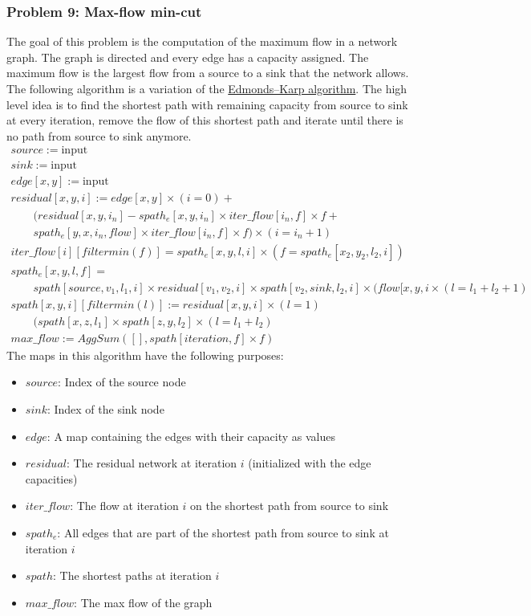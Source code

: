 \documentclass[11pt]{article}
\begin{document}
\subsubsection*{Problem 9: Max-flow min-cut}
The goal of this problem is the computation of the maximum flow in a network graph.
The graph is directed and every edge has a capacity assigned.
The maximum flow is the largest flow from a source to a sink that the network allows.
The following algorithm is a variation of the \href{http://en.wikipedia.org/wiki/Edmonds%E2%80%93Karp_algorithm}{Edmonds–Karp algorithm}. 
The high level idea is to find the shortest path with remaining capacity from source to sink at every iteration, remove the flow of this shortest path and iterate until there is no path from source to sink anymore.
\[
\begin{array}{l}
source := \text{input} \\
sink := \text{input} \\
edge[x,y] := \text{input} \\
residual[x,y,i] := edge[x,y] \times (i = 0) + \\
\qquad (residual[x,y,i_n] - spath_e[x,y,i_n] \times iter\_flow[i_n,f] \times f + \\
\qquad spath_e[y,x,i_n,flow] \times iter\_flow[i_n,f] \times f) \times (i = i_n + 1)\\
iter\_flow[i][filtermin(f)] = spath_e[x,y,l,i] \times (f = spath_e[x_2,y_2,l_2,i]) \\
spath_e[x,y,l,f] = \\
\qquad spath[source,v_1,l_1,i] \times residual[v_1,v_2,i] \times spath[v_2,sink,l_2,i] \times (flow[x,y,i\times (l = l_1 + l_2 + 1) \\ 
spath[x,y,i][filtermin(l)] := residual[x,y,i] \times (l = 1) \\
\qquad (spath[x,z,l_1] \times spath[z,y,l_2] \times (l = l_1 + l_2) \\
max\_flow := AggSum([], spath[iteration, f] \times f)
\end{array}
\]
The maps in this algorithm have the following purposes:
\begin{itemize}
\item $source$: Index of the source node
\item $sink$: Index of the sink node
\item $edge$: A map containing the edges with their capacity as values
\item $residual$: The residual network at iteration $i$ (initialized with the edge capacities)
\item $iter\_flow$: The flow at iteration $i$ on the shortest path from source to sink
\item $spath_e$: All edges that are part of the shortest path from source to sink at iteration $i$
\item $spath$: The shortest paths at iteration $i$
\item $max\_flow$: The max flow of the graph 
\end{itemize}
\end{document}
